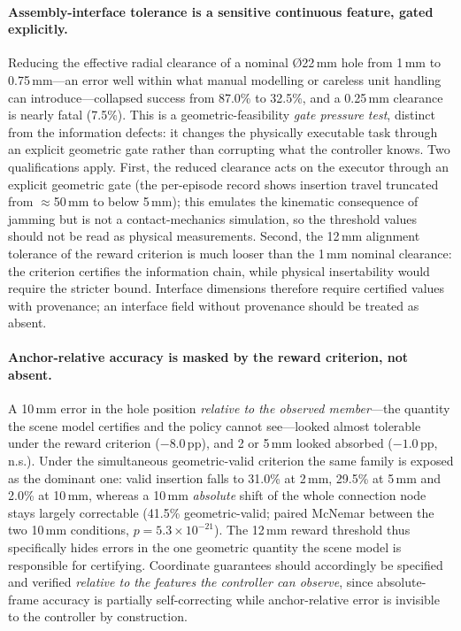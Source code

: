 \paragraph{Assembly-interface tolerance is a sensitive continuous
feature, gated explicitly.} Reducing the effective radial clearance of a
nominal \O22\,mm hole from 1\,mm to 0.75\,mm---an error well within what
manual modelling or careless unit handling can introduce---collapsed success
from 87.0\% to 32.5\%, and a 0.25\,mm clearance is nearly fatal (7.5\%).
This is a geometric-feasibility \emph{gate pressure test}, distinct from the
information defects: it changes the physically executable task through an
explicit geometric gate rather than corrupting what the controller knows.
Two qualifications apply. First, the reduced clearance acts on the executor
through an explicit geometric gate (the per-episode record shows insertion
travel truncated from $\approx$50\,mm to below 5\,mm); this emulates the
kinematic consequence of jamming but is not a contact-mechanics simulation,
so the threshold values should not be read as physical measurements. Second,
the 12\,mm alignment tolerance of the reward criterion is much looser than
the 1\,mm nominal clearance: the criterion certifies the information chain,
while physical insertability would require the stricter bound. Interface
dimensions therefore require certified values with provenance; an interface
field without provenance should be treated as absent.

\paragraph{Anchor-relative accuracy is masked by the reward criterion, not
absent.} A 10\,mm error in the hole position \emph{relative to the observed
member}---the quantity the scene model certifies and the policy cannot
see---looked almost tolerable under the reward criterion ($-8.0$\,pp), and 2
or 5\,mm looked absorbed ($-1.0$\,pp, n.s.). Under the simultaneous
geometric-valid criterion the same family is exposed as the dominant one:
valid insertion falls to 31.0\% at 2\,mm, 29.5\% at 5\,mm and 2.0\% at
10\,mm, whereas a 10\,mm \emph{absolute} shift of the whole connection node
stays largely correctable (41.5\% geometric-valid; paired McNemar between the
two 10\,mm conditions, $p=5.3\times10^{-21}$). The 12\,mm reward threshold
thus specifically hides errors in the one geometric quantity the scene model
is responsible for certifying. Coordinate guarantees should accordingly be
specified and verified \emph{relative to the features the controller can
observe}, since absolute-frame accuracy is partially self-correcting while
anchor-relative error is invisible to the controller by construction.

